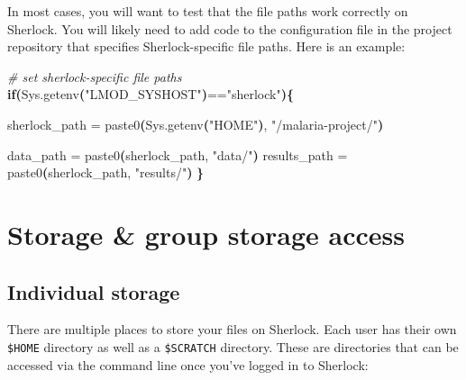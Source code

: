 \documentclass[
]{book}
\newenvironment{Shaded}{\begin{snugshade}}{\end{snugshade}}
\newcommand{\BuiltInTok}[1]{#1}
\newcommand{\CommentTok}[1]{\textcolor[rgb]{0.56,0.35,0.01}{\textit{#1}}}
\newcommand{\ControlFlowTok}[1]{\textcolor[rgb]{0.13,0.29,0.53}{\textbf{#1}}}
\newcommand{\ErrorTok}[1]{\textcolor[rgb]{0.64,0.00,0.00}{\textbf{#1}}}
\newcommand{\ExtensionTok}[1]{#1}
\newcommand{\KeywordTok}[1]{\textcolor[rgb]{0.13,0.29,0.53}{\textbf{#1}}}
\newcommand{\NormalTok}[1]{#1}
\newcommand{\StringTok}[1]{\textcolor[rgb]{0.31,0.60,0.02}{#1}}
\newcommand{\VariableTok}[1]{\textcolor[rgb]{0.00,0.00,0.00}{#1}}
\begin{document}
In most cases, you will want to test that the file paths work correctly on Sherlock. You will likely need to add code to the configuration file in the project repository that specifies Sherlock-specific file paths. Here is an example:

\begin{Shaded}
\begin{Highlighting}[]
\CommentTok{\# set sherlock{-}specific file paths}
\ControlFlowTok{if}\KeywordTok{(}\ExtensionTok{Sys.getenv}\ErrorTok{(}\StringTok{"LMOD\_SYSHOST"}\KeywordTok{)}\ExtensionTok{==}\StringTok{"sherlock"}\KeywordTok{)\{}
  
  \ExtensionTok{sherlock\_path}\NormalTok{ = paste0}\ErrorTok{(}\ExtensionTok{Sys.getenv}\ErrorTok{(}\StringTok{"HOME"}\KeywordTok{)}\ExtensionTok{,} \StringTok{"/malaria{-}project/"}\KeywordTok{)}
  
  \ExtensionTok{data\_path}\NormalTok{ = paste0}\ErrorTok{(}\ExtensionTok{sherlock\_path,} \StringTok{"data/"}\KeywordTok{)}
  \ExtensionTok{results\_path}\NormalTok{ = paste0}\ErrorTok{(}\ExtensionTok{sherlock\_path,} \StringTok{"results/"}\KeywordTok{)}
\KeywordTok{\}}
\end{Highlighting}
\end{Shaded}

\section{Storage \& group storage access}\label{storage-group-storage-access}

\subsection{Individual storage}\label{individual-storage}

There are multiple places to store your files on Sherlock. Each user has their own \texttt{\$HOME} directory as well as a \texttt{\$SCRATCH} directory. These are directories that can be accessed via the command line once you've logged in to Sherlock:

\begin{Shaded}
\end{Shaded}
\end{document}
